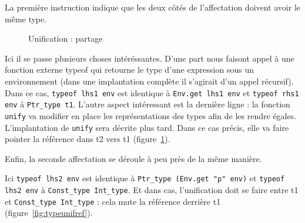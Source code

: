 
La première instruction indique que les deux côtés de l'affectation doivent
avoir le même type.


\begin{figure}
  \centering
  \caption{Unification : partage}
  \label{fig:unifsharing}
\end{figure}

Ici il se passe plusieurs choses intéréssantes. D'une part nous faisont appel à
une fonction externe typeof qui retourne le type d'une expression sous un
environnement (dans une implantation complète il s'agirait d'un appel récursif).
Dans ce cas, \texttt{typeof lhs1 env} est identique à \texttt{Env.get lhs1 env}
et \texttt{typeof rhs1 env} à \texttt{Ptr\_type t1}. L'autre aspect intéressant
est la dernière ligne : la fonction \texttt{unify} va modifier en place les
représentations des types afin de les rendre égales. L'implantation de
\texttt{unify} sera décrite plus tard. Dans ce cas précis, elle va faire pointer
la référence dans t2 vers t1 (figure~\ref{fig:unifsharing}).

Enfin, la seconde affectation se déroule à peu près de la même manière.


Ici \texttt{typeof lhs2 env} est identique à \texttt{Ptr\_type (Env.get "p"
env)} et \texttt{typeof lhs2 env} à \texttt{Const\_type Int\_type}. Et dans cas,
l'unification doit se faire entre t1 et \texttt{Const\_type Int\_type} : cela
mute la référence derrière t1 (figure~\ref{fig:typeunifref}).

